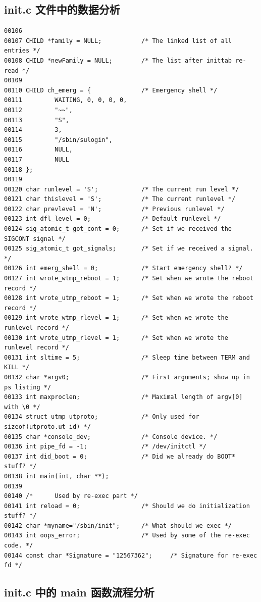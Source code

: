 \subsection{init.c 文件中的数据分析}

{\begin{shaded}\begin{verbatim}
00106 
00107 CHILD *family = NULL;           /* The linked list of all entries */
00108 CHILD *newFamily = NULL;        /* The list after inittab re-read */
00109 
00110 CHILD ch_emerg = {              /* Emergency shell */
00111         WAITING, 0, 0, 0, 0,
00112         "~~",
00113         "S",
00114         3,
00115         "/sbin/sulogin",
00116         NULL,
00117         NULL
00118 };
00119 
00120 char runlevel = 'S';            /* The current run level */
00121 char thislevel = 'S';           /* The current runlevel */
00122 char prevlevel = 'N';           /* Previous runlevel */
00123 int dfl_level = 0;              /* Default runlevel */
00124 sig_atomic_t got_cont = 0;      /* Set if we received the SIGCONT signal */
00125 sig_atomic_t got_signals;       /* Set if we received a signal. */
00126 int emerg_shell = 0;            /* Start emergency shell? */
00127 int wrote_wtmp_reboot = 1;      /* Set when we wrote the reboot record */
00128 int wrote_utmp_reboot = 1;      /* Set when we wrote the reboot record */
00129 int wrote_wtmp_rlevel = 1;      /* Set when we wrote the runlevel record */
00130 int wrote_utmp_rlevel = 1;      /* Set when we wrote the runlevel record */
00131 int sltime = 5;                 /* Sleep time between TERM and KILL */
00132 char *argv0;                    /* First arguments; show up in ps listing */
00133 int maxproclen;                 /* Maximal length of argv[0] with \0 */
00134 struct utmp utproto;            /* Only used for sizeof(utproto.ut_id) */
00135 char *console_dev;              /* Console device. */
00136 int pipe_fd = -1;               /* /dev/initctl */
00137 int did_boot = 0;               /* Did we already do BOOT* stuff? */
00138 int main(int, char **);
00139 
00140 /*      Used by re-exec part */
00141 int reload = 0;                 /* Should we do initialization stuff? */
00142 char *myname="/sbin/init";      /* What should we exec */
00143 int oops_error;                 /* Used by some of the re-exec code. */
00144 const char *Signature = "12567362";     /* Signature for re-exec fd */
\end{verbatim}\end{shaded}}
\subsection{init.c 中的 main 函数流程分析}

